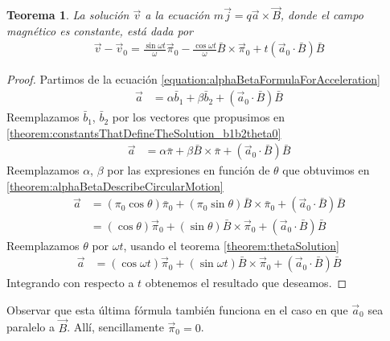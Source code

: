 \documentclass{article}
\newtheorem{theorem}{Teorema}
\begin{document}
  \begin{theorem}
    La solución \(\vec{v}\) a la ecuación \(m \vec{j} = q \vec{a} \times \vec{B}\), donde el campo magnético es constante, está dada por
    \begin{align}
      \vec{v} - \vec{v}_0
      =
      \frac{\sin \omega t}{\omega}
      \vec{\pi}_0
      - \frac{\cos \omega t}{\omega}
      \bar{B}
      \times
      \vec{\pi}_0
      + t (\vec{a}_0 \cdot \bar{B}) \bar{B}
    \end{align}
  \end{theorem}
  \begin{proof}
    Partimos de la ecuación \eqref{equation:alphaBetaFormulaForAcceleration}
    \begin{align}
      \vec{a}
      &=
      \alpha \bar{b}_1 + \beta \bar{b}_2 + (\vec{a}_0 \cdot \bar{B}) \bar{B}
    \end{align}
    Reemplazamos \(\bar{b}_1\), \(\bar{b}_2\) por los vectores que propusimos en \ref{theorem:constantsThatDefineTheSolution_b1b2theta0}
    \begin{align}
      \vec{a}
      &=
      \alpha \bar{\pi} + \beta \bar{B} \times \bar{\pi} + (\vec{a}_0 \cdot \bar{B}) \bar{B}
    \end{align}
    Reemplazamos \(\alpha\), \(\beta\) por las expresiones en función de \(\theta\) que obtuvimos en \ref{theorem:alphaBetaDescribeCircularMotion}
    \begin{align}
      \vec{a}
      &=
      (\pi_0 \cos \theta) \bar{\pi}_0 + (\pi_0 \sin \theta) \bar{B} \times \bar{\pi}_0 + (\vec{a}_0 \cdot \bar{B}) \bar{B}
      \\
      &=
      (\cos \theta) \vec{\pi}_0 + (\sin \theta) \bar{B} \times \vec{\pi}_0 + (\vec{a}_0 \cdot \bar{B}) \bar{B}
    \end{align}
    Reemplazamos \(\theta\) por \(\omega t\), usando el teorema \ref{theorem:thetaSolution}
    \begin{align}
      \vec{a}
      &=
      (\cos \omega t) \vec{\pi}_0
      + (\sin \omega t) \bar{B} \times \vec{\pi}_0
      + (\vec{a}_0 \cdot \bar{B}) \bar{B}
    \end{align}
    Integrando con respecto a \(t\) obtenemos el resultado que deseamos. 
  \end{proof}

  Observar que esta última fórmula también funciona en el caso en que \(\vec{a}_0\) sea paralelo a \(\vec{B}\).
  Allí, sencillamente \(\vec{\pi}_0 = 0\).
\end{document}
